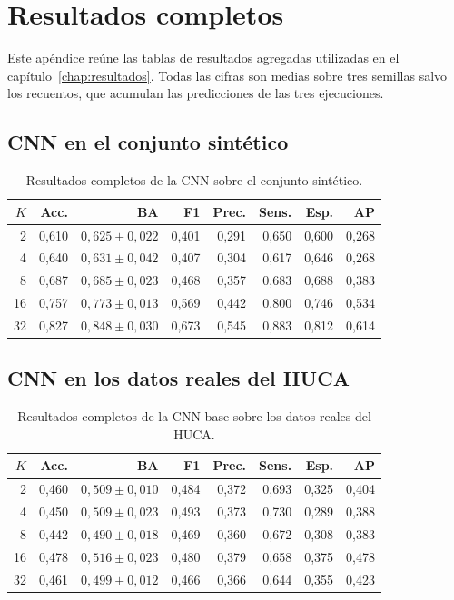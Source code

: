 \chapter{Resultados completos}
\label{app:resultados}

Este apéndice reúne las tablas de resultados agregadas utilizadas en el capítulo~\ref{chap:resultados}. Todas las cifras son medias sobre tres semillas salvo los recuentos, que acumulan las predicciones de las tres ejecuciones.

\section{CNN en el conjunto sintético}

\begin{table}[H]
  \centering
  \small
  \begin{tabular}{rrrrrrrr}
    \toprule
    \(K\) & Acc. & BA & F1 & Prec. & Sens. & Esp. & AP \\
    \midrule
    2  & 0,610 & \(0,625 \pm 0,022\) & 0,401 & 0,291 & 0,650 & 0,600 & 0,268 \\
    4  & 0,640 & \(0,631 \pm 0,042\) & 0,407 & 0,304 & 0,617 & 0,646 & 0,268 \\
    8  & 0,687 & \(0,685 \pm 0,023\) & 0,468 & 0,357 & 0,683 & 0,688 & 0,383 \\
    16 & 0,757 & \(0,773 \pm 0,013\) & 0,569 & 0,442 & 0,800 & 0,746 & 0,534 \\
    32 & 0,827 & \(0,848 \pm 0,030\) & 0,673 & 0,545 & 0,883 & 0,812 & 0,614 \\
    \bottomrule
  \end{tabular}
  \caption{Resultados completos de la CNN sobre el conjunto sintético.}
  \label{tab:app_sintetico_completo}
\end{table}

\section{CNN en los datos reales del HUCA}

\begin{table}[H]
  \centering
  \small
  \begin{tabular}{rrrrrrrr}
    \toprule
    \(K\) & Acc. & BA & F1 & Prec. & Sens. & Esp. & AP \\
    \midrule
    2  & 0,460 & \(0,509 \pm 0,010\) & 0,484 & 0,372 & 0,693 & 0,325 & 0,404 \\
    4  & 0,450 & \(0,509 \pm 0,023\) & 0,493 & 0,373 & 0,730 & 0,289 & 0,388 \\
    8  & 0,442 & \(0,490 \pm 0,018\) & 0,469 & 0,360 & 0,672 & 0,308 & 0,383 \\
    16 & 0,478 & \(0,516 \pm 0,023\) & 0,480 & 0,379 & 0,658 & 0,375 & 0,478 \\
    32 & 0,461 & \(0,499 \pm 0,012\) & 0,466 & 0,366 & 0,644 & 0,355 & 0,423 \\
    \bottomrule
  \end{tabular}
  \caption{Resultados completos de la CNN base sobre los datos reales del HUCA.}
  \label{tab:app_huca_completo}
\end{table}

